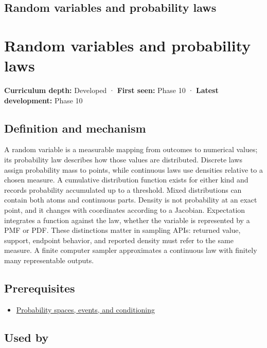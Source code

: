 \hypertarget{appendix-4d0203f7944f}{}
\section*{Random variables and probability laws}
\chapter{Random variables and probability laws}\label{appendix-4d0203f7944f-random-variables-and-probability-laws}

\textbf{Curriculum depth:} Developed · \textbf{First seen:} Phase 10 · \textbf{Latest development:} Phase 10

\section{Definition and mechanism}\label{appendix-4d0203f7944f-definition-and-mechanism}

A random variable is a measurable mapping from outcomes to numerical values; its probability law describes how those values are distributed. Discrete laws assign probability mass to points, while continuous laws use densities relative to a chosen measure. A cumulative distribution function exists for either kind and records probability accumulated up to a threshold. Mixed distributions can contain both atoms and continuous parts. Density is not probability at an exact point, and it changes with coordinates according to a Jacobian. Expectation integrates a function against the law, whether the variable is represented by a PMF or PDF. These distinctions matter in sampling APIs: returned value, support, endpoint behavior, and reported density must refer to the same measure. A finite computer sampler approximates a continuous law with finitely many representable outputs.

\section{Prerequisites}\label{appendix-4d0203f7944f-prerequisites}

\begin{itemize}
\tightlist
\item
  \hyperref[appendix-f1ef323f6ed7]{Probability spaces, events, and conditioning}
\end{itemize}

\section{Used by}\label{appendix-4d0203f7944f-used-by}

